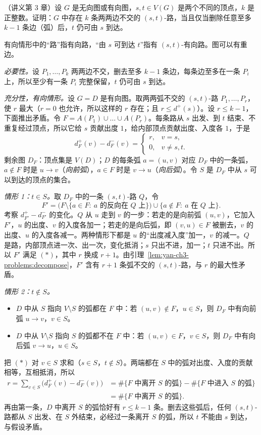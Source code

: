 \begin{workedexample}[问题 2]\label{we:yan-ch3-problems:edge-menger}
（讲义第 3 章）设 $G$ 是无向图或有向图，$s,t\in V(G)$ 是两个不同的顶点，$k$ 是正整数。证明：$G$ 中存在 $k$ 条两两边不交的 $(s,t)$-路，当且仅当删除任意至多 $k-1$ 条边（弧）后，$t$ 仍可由 $s$ 到达。
\end{workedexample}
\begin{solution}
有向情形中的“路”指有向路，“由 $s$ 可到达 $t$”指有 $(s,t)$-有向路。图可以有重边。

\emph{必要性。}设 $P_1,\dots,P_k$ 两两边不交，删去至多 $k-1$ 条边，每条边至多在一条 $P_i$ 上，所以至少有一条 $P_i$ 完整保留，$t$ 仍可由 $s$ 到达。

\emph{充分性，有向情形。}设 $G=D$ 是有向图。取两两弧不交的 $(s,t)$-路 $P_1,\dots,P_r$，使 $r$ 最大（$r=0$ 也允许，所以这样的 $r$ 存在；且 $r\leqslant d^+(s)$）。设 $r\leqslant k-1$，下面推出矛盾。令 $F=A(P_1)\cup\dots\cup A(P_r)$。每条路从 $s$ 出发、到 $t$ 结束、不重复经过顶点，所以它给 $s$ 贡献出度 $1$，给内部顶点贡献出度、入度各 $1$，于是
\[
d_F^+(v)-d_F^-(v)=\begin{cases}r,&v=s,\\0,&v\neq s,t.\end{cases}\tag{$*$}
\]
剩余图 $D_F$：顶点集是 $V(D)$；$D$ 的每条弧 $a=(u,v)$ 对应 $D_F$ 中的一条弧，$a\notin F$ 时是 $u\to v$（\emph{向前弧}），$a\in F$ 时是 $v\to u$（\emph{向后弧}）。令 $S$ 是 $D_F$ 中从 $s$ 可以到达的顶点的集合。

\emph{情形 1：$t\in S$。}取 $D_F$ 中的一条 $(s,t)$-路 $Q$，令
\[
F'=\bigl(F\setminus\{a\in F:\ a\text{ 的反向在 }Q\text{ 上}\}\bigr)\cup\{a\notin F:\ a\text{ 在 }Q\text{ 上}\}.
\]
考察 $d_{F'}^+-d_{F'}^-$ 的变化。$Q$ 从 $u$ 走到 $v$ 的一步：若走的是向前弧 $(u,v)$，它加入 $F'$，$u$ 的出度、$v$ 的入度各加一；若走的是向后弧，即 $(v,u)\in F$ 被删去，$v$ 的出度、$u$ 的入度各减一。两种情形下都是 $u$ 的“出度减入度”加一，$v$ 的减一。$Q$ 是路，内部顶点进一次、出一次，变化抵消；$s$ 只出不进，加一；$t$ 只进不出。所以 $F'$ 满足 $(*)$，其中 $r$ 换成 $r+1$。由引理~\ref{lem:yan-ch3-problems:decompose}，$F'$ 含有 $r+1$ 条弧不交的 $(s,t)$-路，与 $r$ 的最大性矛盾。

\emph{情形 2：$t\notin S$。}
\begin{itemize}
\item $D$ 中从 $S$ 指向 $V\setminus S$ 的弧都在 $F$ 中：若 $(u,v)\notin F$，$u\in S$，则 $D_F$ 中有向前弧 $u\to v$，$v\in S$。
\item $D$ 中从 $V\setminus S$ 指向 $S$ 的弧都不在 $F$ 中：若 $(u,v)\in F$，$v\in S$，则 $D_F$ 中有向后弧 $v\to u$，$u\in S$。
\end{itemize}
把 $(*)$ 对 $v\in S$ 求和（$s\in S$，$t\notin S$）。两端都在 $S$ 中的弧对出度、入度的贡献相等，互相抵消，所以
\[
\begin{aligned}
r=\sum_{v\in S}\bigl(d_F^+(v)-d_F^-(v)\bigr)&=\#\{F\text{ 中离开 }S\text{ 的弧}\}-\#\{F\text{ 中进入 }S\text{ 的弧}\}\\
&=\#\{F\text{ 中离开 }S\text{ 的弧}\}.
\end{aligned}
\]
再由第一条，$D$ 中离开 $S$ 的弧恰好有 $r\leqslant k-1$ 条。删去这些弧后，任何 $(s,t)$-路都从 $S$ 出发、在 $S$ 外结束，必经过一条离开 $S$ 的弧，所以 $t$ 不能由 $s$ 到达，与假设矛盾。


\end{solution}
